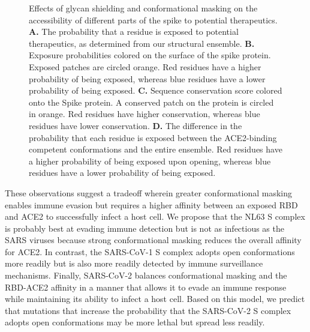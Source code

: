 \documentclass[../main.tex]{subfiles}
\begin{document}
\begin{figure}[!htb]
                {Effects of glycan shielding and conformational masking on the accessibility of different parts of the spike to potential therapeutics. \textbf{A.} The probability that a residue is exposed to potential therapeutics, as determined from our structural ensemble. \textbf{B.} Exposure probabilities colored on the surface of the spike protein. Exposed patches are circled orange. Red residues have a higher probability of being exposed, whereas blue residues have a lower probability of being exposed. \textbf{C.} Sequence conservation score colored onto the Spike protein. A conserved patch on the protein is circled in orange. Red residues have higher conservation, whereas blue residues have lower conservation. \textbf{D.} The difference in the probability that each residue is exposed between the ACE2-binding competent conformations and the entire ensemble. Red residues have a higher probability of being exposed upon opening, whereas blue residues have a lower probability of being exposed.}
            \label{fig:ch7-fig3}
        \end{figure}

        These observations suggest a tradeoff wherein greater conformational masking enables immune evasion but requires a higher affinity between an exposed RBD and ACE2 to successfully infect a host cell. We propose that the NL63 S complex is probably best at evading immune detection but is not as infectious as the SARS viruses because strong conformational masking reduces the overall affinity for ACE2. In contrast, the SARS-CoV-1 S complex adopts open conformations more readily but is also more readily detected by immune surveillance mechanisms. Finally, SARS-CoV-2 balances conformational masking and the RBD-ACE2 affinity in a manner that allows it to evade an immune response while maintaining its ability to infect a host cell. Based on this model, we predict that mutations that increase the probability that the SARS-CoV-2 S complex adopts open conformations may be more lethal but spread less readily.
\end{document}
